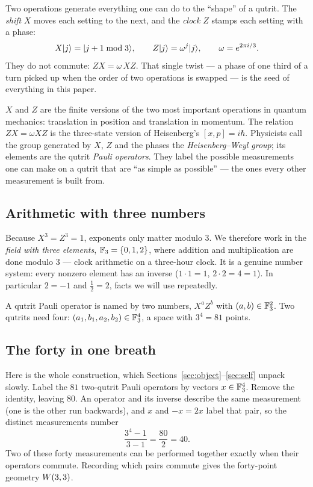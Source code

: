 Two operations generate everything one can do to the ``shape'' of a qutrit. The
\emph{shift} $X$ moves each setting to the next, and the \emph{clock} $Z$ stamps each
setting with a phase:
\[
X\lvert j\rangle=\lvert j+1 \bmod 3\rangle,\qquad Z\lvert j\rangle=\omega^{j}\lvert j\rangle,\qquad \omega=e^{2\pi i/3}.
\]
They do not commute: $ZX=\omega\,XZ$. That single twist --- a phase of one third of a
turn picked up when the order of two operations is swapped --- is the seed of
everything in this paper.

\begin{physical}
$X$ and $Z$ are the finite versions of the two most important operations in quantum
mechanics: translation in position and translation in momentum. The relation
$ZX=\omega XZ$ is the three-state version of Heisenberg's $[x,p]=i\hbar$. Physicists
call the group generated by $X$, $Z$ and the phases the \emph{Heisenberg--Weyl group};
its elements are the qutrit \emph{Pauli operators}. They label the possible
measurements one can make on a qutrit that are ``as simple as possible'' --- the
ones every other measurement is built from.
\end{physical}

\subsection{Arithmetic with three numbers}

Because $X^3=Z^3=1$, exponents only matter modulo $3$. We therefore work in the
\emph{field with three elements}, $\mathbb{F}_3=\{0,1,2\}$, where addition and multiplication
are done modulo $3$ --- clock arithmetic on a three-hour clock. It is a genuine
number system: every nonzero element has an inverse ($1\cdot1=1$, $2\cdot2=4=1$).
In particular $2=-1$ and $\tfrac12=2$, facts we will use repeatedly.

A qutrit Pauli operator is named by two numbers, $X^aZ^b$ with $(a,b)\in\mathbb{F}_3^2$.
Two qutrits need four: $(a_1,b_1,a_2,b_2)\in\mathbb{F}_3^4$, a space with $3^4=81$ points.

\subsection{The forty in one breath}

Here is the whole construction, which Sections~\ref{sec:object}--\ref{sec:self} unpack
slowly. Label the $81$ two-qutrit Pauli operators by vectors $x\in\mathbb{F}_3^4$. Remove the
identity, leaving $80$. An operator and its inverse describe the same measurement
(one is the other run backwards), and $x$ and $-x=2x$ label that pair, so the distinct
measurements number
\[
\frac{3^4-1}{3-1}=\frac{80}{2}=40 .
\]
Two of these forty measurements can be performed together exactly when their operators
commute. Recording which pairs commute gives the forty-point geometry $W(3,3)$.

